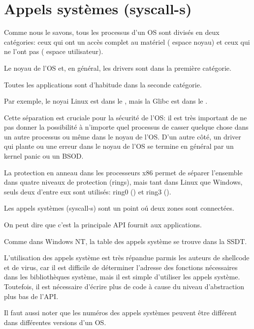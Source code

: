 \section{Appels systèmes (syscall-s)}

\label{syscalls}

Comme nous le savons, tous les processus d'un \ac{OS} sont divisés en deux catégories:
ceux qui ont un accès complet au matériel ( espace noyau)
et ceux qui ne l'ont pas ( espace utilisateur).

Le noyau de l'OS et, en général, les drivers sont dans la première catégorie.

Toutes les applications sont d'habitude dans la seconde catégorie.

Par exemple, le noyai Linux est dans le , mais la Glibc est dans
le .

Cette séparation est cruciale pour la sécurité de l'\ac{OS}: il est très important
de ne pas donner la possibilité à n'importe quel processus de casser quelque chose
dans un autre processus ou même dans le noyau de l'\ac{OS}.
D'un autre côté, un driver qui plante ou une erreur dans le noyau de l'\ac{OS} se
termine en général par un kernel panic ou un \ac{BSOD}.

La protection en anneau dans les processeurs x86 permet de séparer l'ensemble dans
quatre niveaux de protection (rings), mais tant dans Linux que Windows, seuls deux
d'entre eux sont utilisés: ring0 () et ring3 ().

Les appels systèmes (syscall-s) sont un point oú deux zones sont connectées.

On peut dire que c'est la principale \ac{API} fournit aux applications.

Comme dans \gls{Windows NT}, la table des appels système se trouve dans la \ac{SSDT}.


L'utilisation des appels système est très répandue parmis les auteurs de shellcode
et de virus, car il est difficile de déterminer l'adresse des fonctions nécessaires
dans les bibliothèques système, mais il est simple d'utiliser les appels système.
Toutefois, il est nécessaire d'écrire plus de code à cause du niveau d'abstraction
plus bas de l'\ac{API}.

Il faut aussi noter que les numéros des appels systèmes peuvent être différent dans
différentes versions d'un OS.

